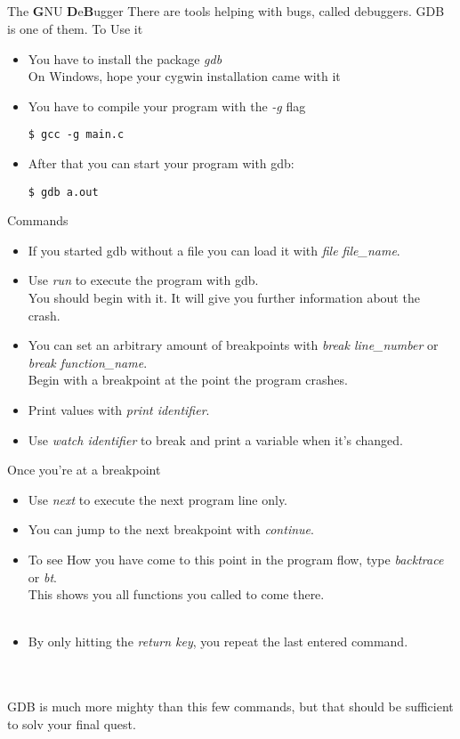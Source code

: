 \subsection{}
\begin{frame}[fragile]{The \textbf{G}NU \textbf{D}e\textbf{B}ugger}
	There are tools helping with bugs, called debuggers. GDB is one of them.
	To Use it
	\begin{itemize}
		\item You have to install the package \textit{gdb}\\
		On Windows, hope your cygwin installation came with it
		\item You have to compile your program with the \textit{-g} flag
		\begin{lstlisting}[numbers=none]
$ gcc -g main.c
\end{lstlisting}
		\item After that you can start your program with gdb:
		\begin{lstlisting}[numbers=none]
$ gdb a.out
\end{lstlisting}
	\end{itemize}
\end{frame}
\begin{frame}{Commands}
	\begin{itemize}
		\item If you started gdb without a file you can load it with \textit{file file\_name}.
		\item Use \textit{run} to execute the program with gdb.\\
		You should begin with it. It will give you further information about the crash.
		\item You can set an arbitrary amount of breakpoints with \textit{break line\_number} or \textit{break function\_name}.\\
		Begin with a breakpoint at the point the program crashes.
		\item Print values with \textit{print identifier}.
		\item Use \textit{watch identifier} to break and print a variable when it's changed.
	\end{itemize}
\end{frame}
\begin{frame}{Once you're at a breakpoint}
	\begin{itemize}
		\item Use \textit{next} to execute the next program line only.
		\item You can jump to the next breakpoint with \textit{continue}.
		\item To see How you have come to this point in the program flow, type \textit{backtrace} or \textit{bt}.\\
		This shows you all functions you called to come there.
		\\\ \\
		\item By only hitting the \textit{return key}, you repeat the last entered  command.
	\end{itemize}
	\ \\\ \\
	GDB is much more mighty than this few commands, but that should be sufficient to solv your final quest.
\end{frame}
